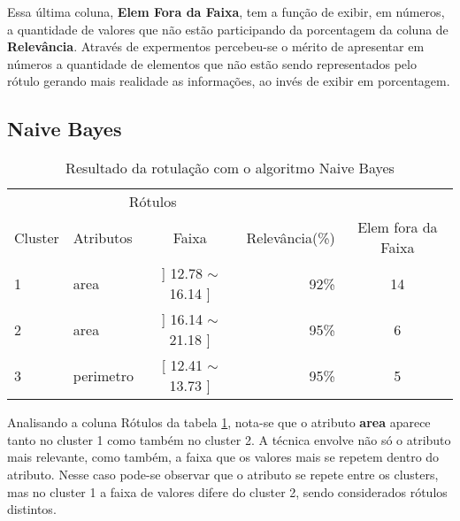 Essa última coluna, \textbf{Elem Fora da Faixa}, tem a função de exibir, em números, a quantidade de valores que não estão participando da porcentagem da coluna de \textbf{Relevância}. Através de expermentos percebeu-se o mérito de apresentar em números a quantidade de elementos que não estão sendo representados pelo rótulo gerando mais realidade as informações, ao invés de exibir em porcentagem.

\subsection{Naive Bayes} \label{cap:resultados:ssec:seed:nb}
\begin{table}[!h]
\centering
\caption{Resultado da rotulação com o algoritmo Naive Bayes}
\label{tab:rot:seeds:nb}
\begin{tabular}{llcrc}
\hline
\multicolumn{1}{c}{\cellcolor[HTML]{FFFFFF}} & \multicolumn{2}{c}{Rótulos}                & \multicolumn{1}{r}{}               & \\ \cline{2-3}
Cluster                                      & Atributos      & \multicolumn{1}{c}{Faixa} & \multicolumn{1}{c}{Relevância(\%)} & Elem fora da Faixa\\ \hline \hline
1                                            & area           & ] 12.78 $\sim$  16.14 ]   & 92\%                               & 14\\  \hline
2                                            & area           & ] 16.14 $\sim$  21.18 ]   & 95\%                               & 6\\ \hline
3                                            & perimetro      & [ 12.41 $\sim$  13.73 ]   & 95\%                               & 5\\ \hline \hline
\end{tabular}
\end{table}



Analisando a coluna Rótulos da tabela \ref{tab:rot:seeds:nb}, nota-se que o atributo \textbf{area} aparece tanto no  cluster 1 como também no cluster 2. A técnica envolve não só o atributo mais relevante, como também, a faixa que os valores mais se repetem dentro do atributo. Nesse caso pode-se observar que o atributo se repete entre os clusters, mas no cluster 1 a faixa de valores difere do cluster 2, sendo considerados rótulos distintos.



